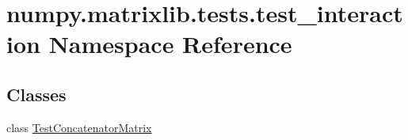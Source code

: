 \hypertarget{namespacenumpy_1_1matrixlib_1_1tests_1_1test__interaction}{}\section{numpy.\+matrixlib.\+tests.\+test\+\_\+interaction Namespace Reference}
\label{namespacenumpy_1_1matrixlib_1_1tests_1_1test__interaction}
\subsection*{Classes}
\begin{DoxyCompactItemize}
\item 
class \hyperlink{classnumpy_1_1matrixlib_1_1tests_1_1test__interaction_1_1TestConcatenatorMatrix}{Test\+Concatenator\+Matrix}
\end{DoxyCompactItemize}
